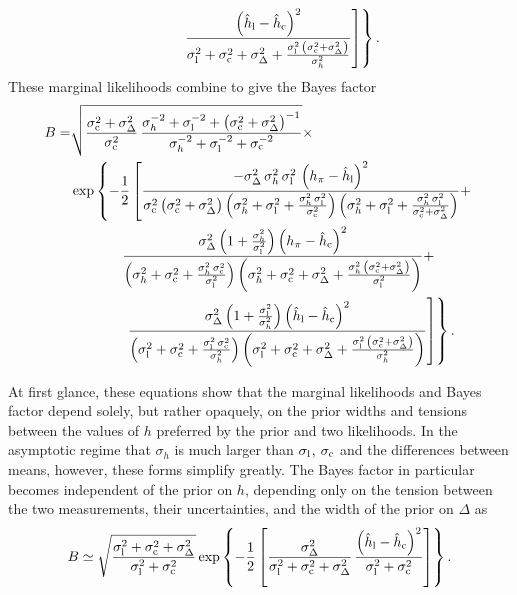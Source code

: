 \documentclass[a4paper,fleqn,usenatbib]{mnras}
\newcommand{\hlobs}{\hat{h}_{\rm l}}
\newcommand{\hcobs}{\hat{h}_{\rm c}}
\newcommand{\hlerr}{\sigma_{\rm l}}
\newcommand{\hcerr}{\sigma_{\rm c}}
\begin{document}
{\begin{align}
  & \phantom{\exp \{ -\frac{1}{2} [{}} \left. \left. \frac{ \left( \hlobs - \hcobs \right)^2 }{ \hlerr^2 + \hcerr^2 + \sigma_\Delta^2 + \frac{ \hlerr^2 \, \left(\hcerr^2 + \sigma_\Delta^2 \right) }{ \sigma_h^2 } } \right] \right\}.
\end{align}
These marginal likelihoods combine to give the Bayes factor 
\begin{align}
B = & \sqrt{\frac{\hcerr^2 + \sigma_\Delta^2}{\hcerr^2} \, \frac{\sigma_h^{-2} + \hlerr^{-2} + \left(\hcerr^2 + \sigma_\Delta^2 \right)^{-1} }{ \sigma_h^{-2} + \hlerr^{-2} + \hcerr^{-2}}} \nonumber \times \\
  &  \exp \left\{ -\frac{1}{2} \left[ \frac{ - \sigma_\Delta^2 \, \sigma_h^2 \, \hlerr^2 \, \left( h_\pi - \hlobs \right)^2 }{  \hcerr^2 \left( \hcerr^2 + \sigma_\Delta^2 \right) \left(\sigma_h^2 + \hlerr^2 + \frac{ \sigma_h^2 \, \hlerr^2 }{ \hcerr^2 } \right) \left(\sigma_h^2 + \hlerr^2 + \frac{ \sigma_h^2 \, \hlerr^2 }{ \hcerr^2 + \sigma_\Delta^2 } \right) } + \right. \right. \nonumber \\
  &  \phantom{ \exp ( -\frac{1}{2} [{}} \frac{ \sigma_\Delta^2 \left(1 + \frac{ \sigma_h^2 }{ \hlerr^2} \right) \left( h_\pi - \hcobs \right)^2 }{ \left( \sigma_h^2 + \hcerr^2 + \frac{ \sigma_h^2 \,\hcerr^2 }{ \hlerr^2 } \right) \left (\sigma_h^2 + \hcerr^2 + \sigma_\Delta^2 + \frac{ \sigma_h^2 \, \left(\hcerr^2 + \sigma_\Delta^2 \right) }{ \hlerr^2 } \right) } + \nonumber \\
  & \phantom{\exp ( -\frac{1}{2} [{}} \left. \left. \frac{ \sigma_\Delta^2 \left(1 + \frac{ \hlerr^2 }{ \sigma_h^2 } \right) \left( \hlobs - \hcobs \right)^2 }{ \left( \hlerr^2 + \hcerr^2 + \frac{ \hlerr^2 \,\hcerr^2 }{ \sigma_h^2 } \right) \left (\hlerr^2 + \hcerr^2 + \sigma_\Delta^2 + \frac{ \hlerr^2 \, \left(\hcerr^2 + \sigma_\Delta^2 \right) }{ \sigma_h^2 } \right) } \right] \right\}.
\end{align}

At first glance, these equations show that the marginal likelihoods and Bayes factor depend solely, but rather opaquely, on the prior widths and tensions between the values of $h$ preferred by the prior and two likelihoods. In the asymptotic regime that $\sigma_h$ is much larger than $\hlerr$, $\hcerr$ and the differences between means, however, these forms simplify greatly. The Bayes factor in particular becomes independent of the prior on $h$, depending only on the tension between the two measurements, their uncertainties, and the width of the prior on $\Delta$ as
\begin{equation}
B \simeq  \sqrt{\frac{\hlerr^2 + \hcerr^2 + \sigma_\Delta^2}{\hlerr^2 + \hcerr^2}} \exp \left\{ -\frac{1}{2} \left[  \frac{ \sigma_\Delta^2 }{ \hlerr^2 + \hcerr^2 + \sigma_\Delta^2 } \, \frac{ \left( \hlobs - \hcobs \right)^2 }{ \hlerr^2 + \hcerr^2 } \right] \right\}.
\end{equation}

}
\end{document}
